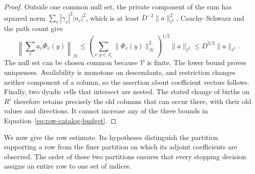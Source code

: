 \begin{proof}
Outside one common null set, the private component of the sum has
squared norm $\sum_v|\gamma_v|^2|a_v|^2$, which is at least
$D^{-2}\|a\|_{\ell^2}^2$.  Cauchy--Schwarz and the path count give
\[
 \left\|\sum_va_v\Phi_v(y)\right\|_{\mathcal H}
 \le \left(\sum_{v:y\in J_v}\|\Phi_v(y)\|_{\mathcal H}^2\right)^{1/2}
       \|a\|_{\ell^2}
 \le D^{3/2}\|a\|_{\ell^2}.
\]
The null set can be chosen common because $\mathcal V$ is finite.
The lower bound proves uniqueness.  Availability is monotone on
descendants, and restriction changes neither component of a column,
so the assertion about coefficient vectors follows.  Finally, two
dyadic cells that intersect are nested.  The stated change of births
on $R'$ therefore retains precisely the old columns that can occur
there, with their old values and directions.  It cannot increase
any of the three bounds in Equation~\eqref{eq:row-catalog-budget}.
\end{proof}

We now give the row estimate.  Its hypotheses distinguish the
partition supporting a row from the finer partition on which its
adjoint coefficients are observed.  The order of these two
partitions ensures that every stopping decision assigns an entire
row to one set of indices.

